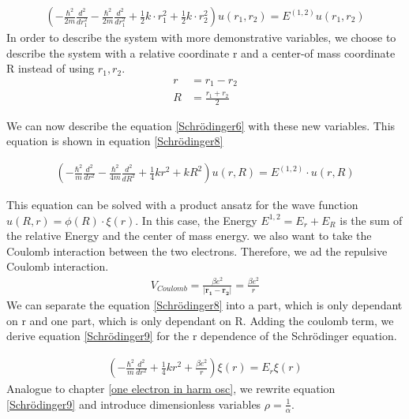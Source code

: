 \documentclass[10pt,a4paper]{article}
\begin{document}
\begin{align}
	\left(-\frac{\hbar^2}{2 m}  \frac{d^2}{dr_1^2} -\frac{\hbar^2}{2 m}  \frac{d^2}{dr_1^2} + \frac{1}{2}k \cdot r_1^2+ \frac{1}{2}k \cdot r_2^2 \right) u(r_1,r_2)= E^{(1,2)} u(r_1,r_2) \label{Schrödinger7}
\end{align}
In order to describe the system with more demonstrative variables, we choose to describe the system with a relative coordinate r and a center-of mass coordinate R instead of using $r_1,r_2$. 
\begin{align}
	r &=r_1-r_2 \\
	R &= \frac{r_1+r_2}{2}
\end{align}

We can now describe the equation \ref{Schrödinger6} with these new variables. This equation is shown in equation \ref{Schrödinger8}

\begin{align}
	\left(-\frac{\hbar^2}{m} \frac{d^2}{dr^2}- \frac{\hbar^2}{4m} \frac{d^2}{dR^2}+\frac{1}{4}k r^2 + k R^2 \right) u (r,R) = E^{(1,2)} \cdot u(r,R) \label{Schrödinger8}
\end{align}

This equation can be solved with a product ansatz for the wave function $u(R,r)= \phi(R) \cdot \xi(r)$. In this case, the Energy $E^{1,2}=E_r+E_R$ is the sum of the relative Energy and the center of mass energy. 
we also want to take the Coulomb interaction between the two electrons. Therefore, we ad the repulsive Coulomb interaction. 
\begin{align}
	V_{Coulomb}= \frac{\beta e^2 }{|\mathbf{r_1}-\mathbf{r_2}|}= \frac{\beta e^2}{r}
\end{align}
We can separate the equation \ref{Schrödinger8} into a part, which is only dependant on r and one part, which is only dependant on R.  Adding the coulomb term, we derive equation \ref{Schrödinger9} for the r dependence of the Schrödinger equation. 

\begin{align}
	\left( - \frac{\hbar^2}{m} \frac{d^2}{dr^2}+ \frac{1}{4} k r^2 + \frac{\beta e^2}{r} \right) \xi(r)= E_r \xi(r) \label{Schrödinger9}
\end{align}
Analogue to chapter \ref{one electron in harm osc}, we rewrite equation \ref{Schrödinger9} and introduce dimensionless variables $\rho=\frac{1}{\alpha}$. 
\end{document}
